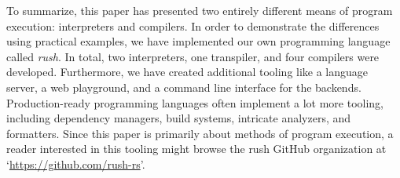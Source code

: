 To summarize, this paper has presented two entirely different means of program execution: interpreters and compilers.
In order to demonstrate the differences using practical examples,
we have implemented our own programming language called \emph{rush}.
In total, two interpreters, one transpiler, and four compilers were developed.
Furthermore, we have created additional tooling like a language server, a web playground, and a command line interface for the backends.
Production-ready programming languages often implement a lot more tooling, including dependency managers, build systems, intricate analyzers, and formatters.
Since this paper is primarily about methods of program execution, a reader interested in this tooling might browse the rush GitHub organization at `\url{https://github.com/rush-rs}'.
